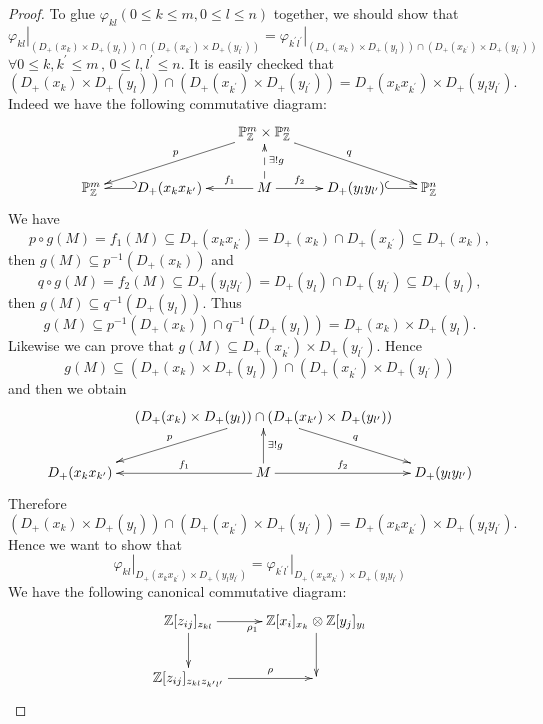 \begin{proof}
To glue $\varphi_{kl}(0\leqslant k\leqslant m, 0\leqslant l\leqslant
n)$ together, we should show that
$$\left.\varphi_{kl}\right|_{(D_+(x_k)\times D_+(y_l))\cap(D_+(x_{k^{\prime}})\times
D_+(y_{l^{\prime}}))}=\left.\varphi_{k^{\prime}l^{\prime}}\right|_{(D_+(x_k)\times
D_+(y_l))\cap(D_+(x_{k^{\prime}})\times D_+(y_{l^{\prime}}))}$$
$\forall 0\leqslant k, k^{\prime}\leqslant m\,,\,0\leqslant l,
l^{\prime}\leqslant n.$ It is easily checked that $(D_+(x_k)\times
D_+(y_l))\cap(D_+(x_{k^{\prime}})\times
D_+(y_{l^{\prime}}))=D_+(x_kx_{k^{\prime}})\times
D_+(y_ly_{l^{\prime}}).$ Indeed we have the following commutative
diagram:
\[ \xymatrix@C=2em{
   & & {\mathbb{P}_{\mathbb{Z}}^m\times\mathbb{P}_{\mathbb{Z}}^n}
   \ar"2,1"_p \ar"2,5"^q                                       \\
   {\mathbb{P}_{\mathbb{Z}}^m} & {D_+(x_kx_{k^{\prime}})}
   \ar@_{(->}[l] & M \ar[l]_-{f_1} \ar[r]^-{f_2} \ar@{-->}[u]_{\exists
   !g} & {D_+(y_ly_{l^{\prime}})} \ar@^{(->}[r] &
   {\mathbb{P}_{\mathbb{Z}}^n} }  \]
We have $$p\circ g(M)=f_1(M)\subseteq
D_+(x_kx_{k^{\prime}})=D_+(x_k)\cap D_+(x_{k^{\prime}})\subseteq
D_+(x_k), $$then $g(M)\subseteq p^{-1}(D_+(x_k))$ and $$q\circ
g(M)=f_2(M)\subseteq D_+(y_ly_{l^{\prime}})=D_+(y_l)\cap
D_+(y_{l^{\prime}})\subseteq D_+(y_l),$$ then $g(M)\subseteq
q^{-1}(D_+(y_l)).$ Thus $$g(M)\subseteq p^{-1}(D_+(x_k))\cap
q^{-1}(D_+(y_l))=D_+(x_k)\times D_+(y_l).$$ Likewise we can prove
that $g(M)\subseteq D_+(x_{k^{\prime}})\times D_+(y_{l^{\prime}}).$
Hence $$g(M)\subseteq (D_+(x_k)\times
D_+(y_l))\cap(D_+(x_{k^{\prime}})\times D_+(y_{l^{\prime}}))$$ and
then we obtain
\[ \xymatrix@C=1em{
   & {(D_+(x_k)\times D_+(y_l))\cap(D_+(x_{k^{\prime}})\times
   D_+(y_{l^{\prime}}))} \ar"2,1"_p \ar"2,3"^q                 \\
   {D_+(x_kx_{k^{\prime}})} & M \ar[l]_-{f_1} \ar[r]^-{f_2} \ar[u]_{\exists ! g} &
   {D_+(y_ly_{l^{\prime}})} }  \]
Therefore $(D_+(x_k)\times D_+(y_l))\cap(D_+(x_{k^{\prime}})\times
D_+(y_{l^{\prime}}))=D_+(x_kx_{k^{\prime}})\times
D_+(y_ly_{l^{\prime}}).$ Hence we want to show that
$$\left.\varphi_{kl}\right|_{D_+(x_kx_{k^{\prime}})\times
D_+(y_ly_{l^{\prime}})}=\left.\varphi_{k^{\prime}l^{\prime}}\right|_{D_+(x_kx_{k^{\prime}})\times
D_+(y_ly_{l^{\prime}})}$$ We have the following canonical
commutative diagram:
\[ \xymatrix{
   {\mathbb{Z}[z_{ij}]_{z_{kl}}} \ar[r]_{\rho_1} \ar[d] &
   {\mathbb{Z}[x_i]_{x_k}\otimes\mathbb{Z}[y_j]_{y_l}} \ar[d]   \\
   {\mathbb{Z}[z_{ij}]_{z_{kl}z_{k^{\prime}l^{\prime}}}}
   \ar[r]^-{\rho} &
}\]
\end{proof}
